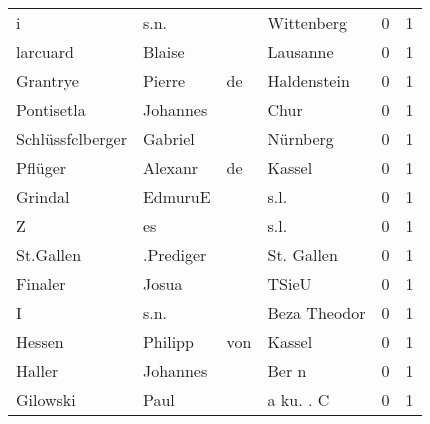 \begin{center}
\begin{tiny}
\begin{longtabu}{llllrr}
                        i &                               s.n. &             &                                  Wittenberg &          0 &         1 \\
                 larcuard &                             Blaise &             &                                    Lausanne &          0 &         1 \\
                 Grantrye &                             Pierre &          de &                                 Haldenstein &          0 &         1 \\
               Pontisetla &                           Johannes &             &                                        Chur &          0 &         1 \\
         Schlüssfclberger &                            Gabriel &             &                                    Nürnberg &          0 &         1 \\
                  Pflüger &                            Alexanr &          de &                                      Kassel &          0 &         1 \\
                  Grindal &                            EdmuruE &             &                                        s.l. &          0 &         1 \\
                        Z &                                 es &             &                                        s.l. &          0 &         1 \\
                St.Gallen &                          .Prediger &             &                                  St. Gallen &          0 &         1 \\
                  Finaler &                              Josua &             &                                       TSieU &          0 &         1 \\
                        I &                               s.n. &             &                                Beza Theodor &          0 &         1 \\
                   Hessen &                            Philipp &         von &                                      Kassel &          0 &         1 \\
                   Haller &                           Johannes &             &                                       Ber n &          0 &         1 \\
                 Gilowski &                               Paul &             &                                   a ku. . C &          0 &         1 \\

\end{longtabu}
\end{tiny}
\end{center}
